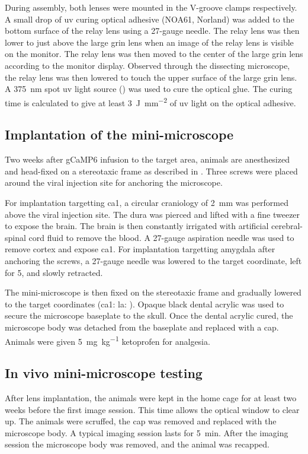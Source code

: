 During assembly, both lenses were mounted in the V-groove clamps respectively. A small drop of \gls{uv} curing optical adhesive (NOA61, Norland) was added to the bottom surface of the relay lens using a 27-gauge needle. The relay lens was then lower to just above the large \gls{grin} lens when an image of the relay lens is visible on the monitor. The relay lens was then moved to the center of the large \gls{grin} lens according to the monitor display. Observed through the dissecting microscope, the relay lens was then lowered to touch the upper surface of the large \gls{grin} lens. A \SI{375}{\nm} spot \gls{uv} light source () was used to cure the optical glue. The curing time is calculated to give at least \SI{3}{\J\per\mm\squared} of \gls{uv} light on the optical adhesive. 


\subsection{Implantation of the mini-microscope}

Two weeks after gCaMP6 infusion to the target area, animals are anesthesized and head-fixed on a stereotaxic frame as described in . Three screws were placed around the viral injection site for anchoring the microscope. 

For implantation targetting \gls{ca1}, a circular craniology of \SI{2}{\mm} was performed above the viral injection site. The dura was pierced and lifted with a fine tweezer to expose the brain. The brain is then constantly irrigated with artificial cerebral-spinal cord fluid to remove the blood. A 27-gauge aspiration needle was used to remove cortex and expose \gls{ca1}. For implantation targetting amygdala after anchoring the screws, a 27-gauge needle was lowered to the target coordinate, left for \SI{5}{\min}, and slowly retracted.

The mini-microscope is then fixed on the stereotaxic frame and gradually lowered to the target coordinates (\gls{ca1}: \gls{la}: ). Opaque black dental acrylic was used to secure the microscope baseplate to the skull. Once the dental acrylic cured, the microscope body was detached from the baseplate and replaced with a cap. Animals were given \SI{5}{\mg\per\kg} ketoprofen for analgesia.

\subsection{In vivo mini-microscope testing}
After lens implantation, the animals were kept in the home cage for at least two weeks before the first image session. This time allows the optical window to clear up. The animals were scruffed, the cap was removed and replaced with the microscope body. A typical imaging session lasts for \SI{5}{\minute}. After the imaging session the microscope body was removed, and the animal was recapped.

